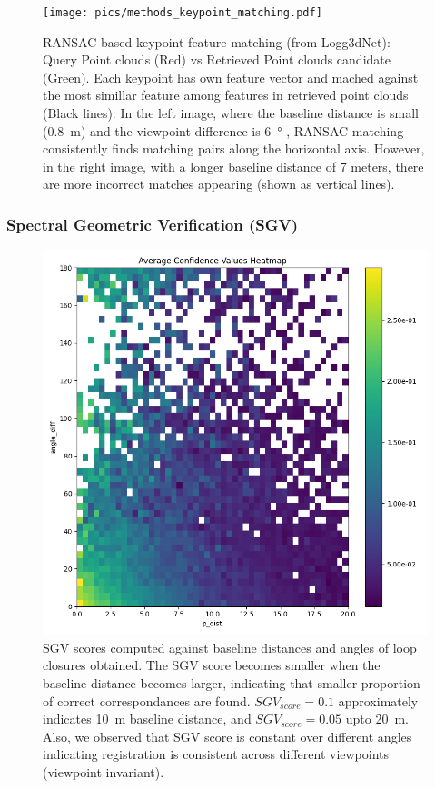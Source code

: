 \begin{figure}[htbp]
  \centering
  \texttt{[image: pics/methods\_keypoint\_matching.pdf]}
  \caption{RANSAC based keypoint feature matching (from Logg3dNet): Query Point clouds (Red) vs Retrieved Point clouds candidate (Green). Each keypoint has own feature vector and mached against the most simillar feature among features in retrieved point clouds (Black lines). In the left image, where the baseline distance is small (\SI{0.8}{\meter}) and the viewpoint difference is \SI{6}{\degree} , RANSAC matching consistently finds matching pairs along the horizontal axis. However, in the right image, with a longer baseline distance of 7 meters, there are more incorrect matches appearing (shown as vertical lines).   }
  \label{fig:RANSAC_keypoint_matching}
\end{figure}



\subsubsection*{\textbf{Spectral Geometric Verification (SGV)}}
\begin{figure}[t]
  \centering
  \includegraphics*[width=0.8\columnwidth]{pics/methods_svg_distance.png}
  \caption{SGV scores computed against baseline distances and angles of loop closures obtained. The SGV score becomes smaller when the baseline distance becomes larger, indicating that smaller proportion of correct correspondances are found. $SGV_{score}=0.1$ approximately indicates \SI{10}{\meter} baseline distance, and $SGV_{score}=0.05$ upto \SI{20}{\meter}. Also, we observed that SGV score is constant over different angles indicating registration is consistent across different viewpoints (viewpoint invariant).}
  \label{fig:sgv_distance}
\end{figure}

